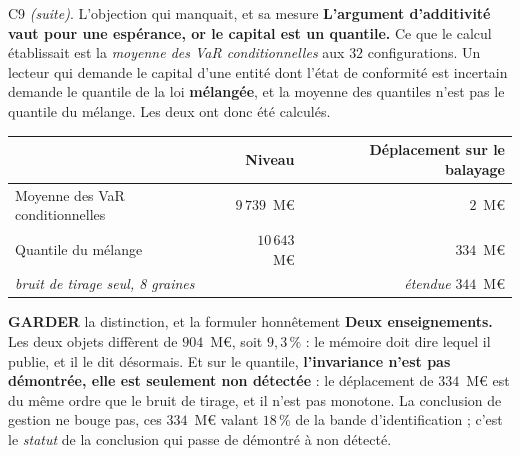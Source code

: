\documentclass[11pt]{beamer}
\newcommand{\garder}{\textbf{GARDER}}
\newcommand{\srcs}[1]{\vspace{0.8mm}{\tiny\textcolor{gray!50!black}{Sources : #1}}}
\begin{document}
\begin{frame}{C9 \emph{(suite)}. L'objection qui manquait, et sa mesure}
\scriptsize
\textbf{L'argument d'additivité vaut pour une espérance, or le capital est un quantile.} Ce que
le calcul établissait est la \emph{moyenne des VaR conditionnelles} aux $32$ configurations. Un
lecteur qui demande le capital d'une entité dont l'état de conformité est incertain demande le
quantile de la loi \textbf{mélangée}, et la moyenne des quantiles n'est pas le quantile du
mélange. Les deux ont donc été calculés.
\vspace{1mm}

\begin{center}
\begin{tabular}{@{}l r r@{}}
\toprule
& \textbf{Niveau} & \textbf{Déplacement sur le balayage} \\
\midrule
Moyenne des VaR conditionnelles & $9\,739$~M\euro & $2$~M\euro \\
Quantile du mélange & $10\,643$~M\euro & $334$~M\euro \\
\midrule
\emph{bruit de tirage seul, 8 graines} & & \emph{étendue} $344$~M\euro \\
\bottomrule
\end{tabular}
\end{center}
\vspace{-1mm}
\begin{block}{\garder{} la distinction, et la formuler honnêtement}
\textbf{Deux enseignements.} Les deux objets diffèrent de $904$~M\euro, soit $9{,}3\,\%$ : le
mémoire doit dire lequel il publie, et il le dit désormais. Et sur le quantile,
\textbf{l'invariance n'est pas démontrée, elle est seulement non détectée} : le déplacement de
$334$~M\euro{} est du même ordre que le bruit de tirage, et il n'est pas monotone. La conclusion
de gestion ne bouge pas, ces $334$~M\euro{} valant $18\,\%$ de la bande d'identification ; c'est
le \emph{statut} de la conclusion qui passe de démontré à non détecté.
\end{block}
\srcs{scripts~\texttt{69} et~\texttt{77}}
\end{frame}
\end{document}
